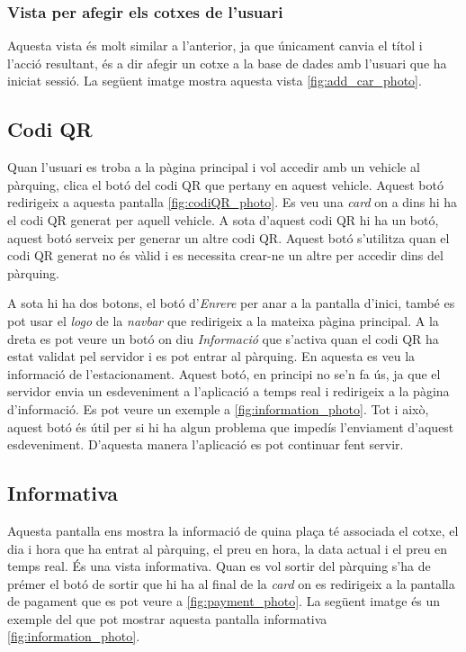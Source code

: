 \subsubsection{Vista per afegir els cotxes de l'usuari}
Aquesta vista és molt similar a l'anterior, ja que únicament canvia el títol i l'acció resultant,
és a dir afegir un cotxe a la base de dades amb l'usuari que ha iniciat sessió.
La següent imatge mostra aquesta vista \autoref{fig:add_car_photo}.

\subsection{Codi QR}
Quan l'usuari es troba a la pàgina principal i vol accedir amb un vehicle al pàrquing, clica el botó del codi QR que pertany en aquest vehicle.
Aquest botó redirigeix a aquesta pantalla \autoref{fig:codiQR_photo}. Es veu una \emph{card} on a dins hi ha el codi QR
generat per aquell vehicle. A sota d'aquest codi QR hi ha un botó, aquest botó serveix per generar un altre codi QR. Aquest botó
s'utilitza quan el codi QR generat no és vàlid
i es necessita crear-ne un altre per accedir dins del pàrquing.

A sota hi ha dos botons, el botó d'\emph{Enrere} per anar a la pantalla d'inici, també es pot usar el \emph{logo}
de la \emph{navbar} que redirigeix a la mateixa pàgina principal. A la dreta es pot veure un botó on diu \emph{Informació}
que s'activa quan el codi QR ha estat validat pel servidor i es pot entrar al pàrquing. En aquesta es veu la informació de l'estacionament.
Aquest botó, en principi no se'n fa ús, ja que el servidor envia un esdeveniment a l'aplicació a temps real i redirigeix
a la pàgina d'informació. Es pot veure un exemple a \autoref{fig:information_photo}.
Tot i això, aquest botó és útil per si hi ha algun problema que impedís l'enviament d'aquest esdeveniment.
D'aquesta manera l'aplicació es pot continuar fent servir.

\subsection{Informativa}
Aquesta pantalla ens mostra la informació de quina plaça té associada el cotxe, el dia i hora que ha entrat al pàrquing,
el preu en hora, la data actual i el preu en temps real. És una vista informativa. Quan es vol sortir del
pàrquing s'ha de prémer el botó de sortir que hi ha al final de la \emph{card} on es redirigeix a la pantalla
de pagament que es pot veure a \autoref{fig:payment_photo}. La següent imatge és un exemple del que pot mostrar aquesta pantalla
informativa \autoref{fig:information_photo}.

